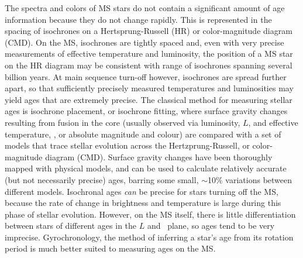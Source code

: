 
The spectra and colors of MS stars do not contain a significant amount of age
information because they do not change rapidly.
This is represented in the spacing of isochrones on a Hertsprung-Russell (HR)
or color-magnitude diagram (CMD).
On the MS, isochrones are tightly spaced and, even with very precise
measurements of effective temperature and luminosity, the position of a MS
star on the HR diagram may be consistent with range of isochrones spanning
several billion years.
At main sequence turn-off however, isochrones are spread further apart, so
that sufficiently precisely measured temperatures and luminosities may yield
ages that are extremely precise.
The classical method for measuring stellar ages is isochrone placement, or
isochrone fitting, where surface gravity changes resulting from fusion in the
core (usually observed via luminosity, $L$, and effective temperature, \teff,
or absolute magnitude and colour) are compared with a set of models that trace
stellar evolution across the Hertzprung-Russell, or color-magnitude diagram
(CMD).
Surface gravity changes have been thoroughly mapped with physical models, and
can be used to calculate relatively accurate (but not necessarily precise)
ages, barring some small, $\sim$10\% variations between different models.
Isochronal ages {\it can} be precise for stars turning off the MS, because the
rate of change in brightness and temperature is large during this phase of
stellar evolution.
However, on the MS itself, there is little differentiation between stars of
different ages in the $L$ and \teff\ plane, so ages tend to be very imprecise.
Gyrochronology, the method of inferring a star's age from its rotation period
is much better suited to measuring ages on the MS.

